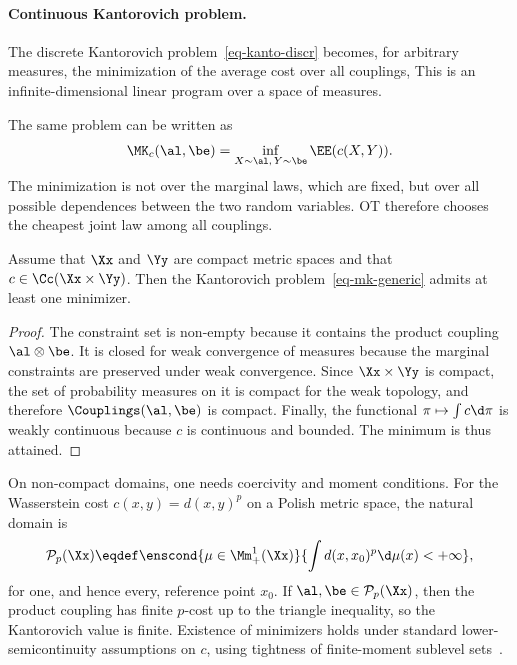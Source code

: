 \paragraph{Continuous Kantorovich problem.}

The discrete Kantorovich problem~\eqref{eq-kanto-discr} becomes, for arbitrary measures, the minimization of the average cost over all couplings,
This is an infinite-dimensional linear program over a space of measures.

\begin{rem}
	The same problem can be written as
	\[
		\MK_c(\al,\be)
		=
		\inf_{X\sim\al,\,Y\sim\be}\EE(c(X,Y)).
	\]
	The minimization is not over the marginal laws, which are fixed, but over all possible dependences between the two random variables. OT therefore chooses the cheapest joint law among all couplings.
\end{rem}

\begin{prop}\label{prop-kantorovich-existence-compact}
	Assume that $\Xx$ and $\Yy$ are compact metric spaces and that $c\in\Cc(\Xx\times\Yy)$. Then the Kantorovich problem~\eqref{eq-mk-generic} admits at least one minimizer.
\end{prop}
\begin{proof}
	The constraint set is non-empty because it contains the product coupling $\al\otimes\be$. It is closed for weak convergence of measures because the marginal constraints are preserved under weak convergence. Since $\Xx\times\Yy$ is compact, the set of probability measures on it is compact for the weak topology, and therefore $\Couplings(\al,\be)$ is compact. Finally, the functional $\pi\mapsto\int c\d\pi$ is weakly continuous because $c$ is continuous and bounded. The minimum is thus attained.
\end{proof}

On non-compact domains, one needs coercivity and moment conditions. For the Wasserstein cost $c(x,y)=d(x,y)^p$ on a Polish metric space, the natural domain is
\[
	\mathcal P_p(\Xx)
	\eqdef
	\enscond{\mu\in\Mm_+^1(\Xx)}{\int d(x,x_0)^p\d\mu(x)<+\infty},
\]
for one, and hence every, reference point $x_0$. If $\al,\be\in\mathcal P_p(\Xx)$, then the product coupling has finite $p$-cost up to the triangle inequality, so the Kantorovich value is finite. Existence of minimizers holds under standard lower-semicontinuity assumptions on $c$, using tightness of finite-moment sublevel sets~\cite{Villani09,SantambrogioBook}.

